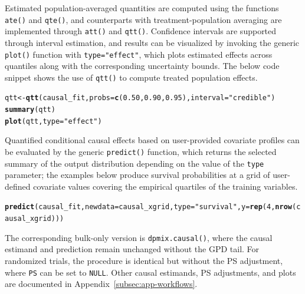\documentclass[article]{jss}\usepackage[]{graphicx}\usepackage[]{xcolor}
\makeatletter
\newcommand{\hlnum}[1]{\textcolor[rgb]{0.686,0.059,0.569}{#1}}%
\newcommand{\hlsng}[1]{\textcolor[rgb]{0.192,0.494,0.8}{#1}}%
\newcommand{\hldef}[1]{\textcolor[rgb]{0.345,0.345,0.345}{#1}}%
\newcommand{\hlkwb}[1]{\textcolor[rgb]{0.69,0.353,0.396}{#1}}%
\newcommand{\hlkwc}[1]{\textcolor[rgb]{0.333,0.667,0.333}{#1}}%
\newcommand{\hlkwd}[1]{\textcolor[rgb]{0.737,0.353,0.396}{\textbf{#1}}}%
\newenvironment{kframe}{%
 \def\at@end@of@kframe{}%
 \ifinner\ifhmode%
  \def\at@end@of@kframe{\end{minipage}}%
  \begin{minipage}{\columnwidth}%
 \fi\fi%
 \def\FrameCommand##1{\hskip\@totalleftmargin \hskip-\fboxsep
 \colorbox{shadecolor}{##1}\hskip-\fboxsep
     \hskip-\linewidth \hskip-\@totalleftmargin \hskip\columnwidth}%
 \MakeFramed {\advance\hsize-\width
   \@totalleftmargin\z@ \linewidth\hsize
   \@setminipage}}%
 {\par\unskip\endMakeFramed%
 \at@end@of@kframe}
\newenvironment{knitrout}{}{} %
\DeclareRobustCommand{\code}[1]{\nolinkurl{#1}}
\makeatother
\begin{document}
Estimated population-averaged quantities are computed using the
functions \code{ate()} and \code{qte()}, and counterparts with
treatment-population averaging are implemented through \code{att()}
and \code{qtt()}. Confidence intervals are supported through
interval estimation, and results can be visualized by invoking the
generic \code{plot()} function with \code{type="effect"}, which
plots estimated effects across quantiles along with the corresponding
uncertainty bounds. The below code snippet shows the use of
\code{qtt()} to compute treated population effects.

\begin{knitrout}\footnotesize
{}\color{fgcolor}\begin{kframe}
\begin{alltt}
\hldef{qtt} \hlkwb{<-} \hlkwd{qtt}\hldef{(causal_fit,} \hlkwc{probs} \hldef{=} \hlkwd{c}\hldef{(}\hlnum{0.50}\hldef{,} \hlnum{0.90}\hldef{,} \hlnum{0.95}\hldef{),} \hlkwc{interval} \hldef{=} \hlsng{"credible"}\hldef{)}
\hlkwd{summary}\hldef{(qtt)}
\hlkwd{plot}\hldef{(qtt,} \hlkwc{type} \hldef{=} \hlsng{"effect"}\hldef{)}
\end{alltt}
\end{kframe}
\end{knitrout}

Quantified conditional causal effects based on user-provided
covariate profiles can be evaluated by the generic
\code{predict()} function, which returns the selected summary of the
output distribution depending on the value of the \code{type}
parameter; the examples below produce survival probabilities at a
grid of user-defined covariate values covering the empirical quartiles
of the training variables.



\begin{knitrout}\footnotesize
{}\color{fgcolor}\begin{kframe}
\begin{alltt}
\hlkwd{predict}\hldef{(causal_fit,} \hlkwc{newdata} \hldef{= causal_xgrid,} \hlkwc{type} \hldef{=} \hlsng{"survival"}\hldef{,} \hlkwc{y} \hldef{=} \hlkwd{rep}\hldef{(}\hlnum{4}\hldef{,} \hlkwd{nrow}\hldef{(causal_xgrid)))}
\end{alltt}
\end{kframe}
\end{knitrout}
The corresponding bulk-only version is \code{dpmix.causal()},
where the causal estimand and prediction remain unchanged without
the GPD tail. For randomized trials, the procedure is identical but
without the PS adjustment, where \code{PS} can be set to \code{NULL}.
Other causal estimands, PS adjustments, and plots are documented in
Appendix~\ref{subsec:app-workflows}.
\end{document}
